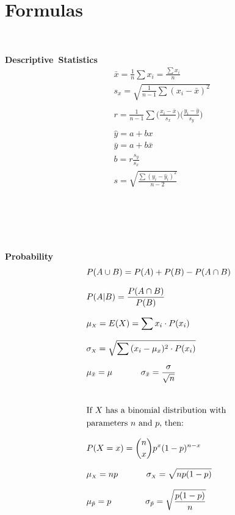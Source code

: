 
\section{Formulas}
\label{formulas}

\ \\[0mm]

\noindent%
\begin{minipage}[l]{0.32\textwidth}
\noindent%
\textbf{Descriptive~Statistics}
\begin{align*}
&\bar{x} =\frac{1}{n}\sum{x_i}=\frac{\sum{x_i}}{n} \\[3.5mm]
&s_x = \sqrt{\frac{1}{n-1}\sum{(x_i-\bar{x})^2}} \\ \\[3.5mm]
&r = \frac{1}{n-1}
    \sum{\Big(\frac{x_i-\bar{x}}{s_x}\Big)
    \Big(\frac{y_i-\bar{y}}{s_y}\Big)} \\ \\[3.5mm]
&\hat{y} = a+bx \\[3.5mm]
&\bar{y} = a + b\bar{x} \\[3.5mm]
&b = r\frac{s_y}{s_x} \\[3.5mm]
& s=\sqrt{\frac{\sum{(y_i-\hat{y}_i)^2}}{n-2}}
\end{align*}
\ \vspace{3mm}

\ 
\end{minipage}
\begin{minipage}[l]{0.13\textwidth}
\ 
\end{minipage}
\begin{minipage}[l]{0.35\textwidth}
\noindent%
\textbf{Probability}
\begin{align*}
&P(A \cup B) = P(A) + P(B) - P(A\cap B) \\[2.5mm]
&P(A | B) = \frac{P(A \cap B)}{P(B)} \\[2.5mm]
&\mu_{\scriptscriptstyle{X}}=E(X)=\sum{x_i\cdot  P(x_i)} \\[2.5mm]
&\sigma_{\scriptscriptstyle{X}}=\sqrt{\sum{(x_i-\mu_x)^2\cdot P(x_i)}} \\[2.5mm]
&\mu_{\bar{x}}
    = \mu \qquad \quad
        \ \sigma_{\bar{x}} = \frac{\sigma}{\sqrt{n}} \\[8mm]
&\text{If $X$ has a binomial distribution with} \\
&\text{parameters $n$ and $p$, then:} \\[2.5mm]
&P(X=x)={n\choose x} p^x(1-p)^{n-x} \\[2.5mm]
&\mu_{\scriptscriptstyle{X}}=np \qquad \quad  \ \sigma_{\scriptscriptstyle{X}}=\sqrt{np(1-p)} \\[2.5mm]
&\mu_{\hat{p}}
    = p\qquad \qquad
        \small{\sigma_{\hat{p}}=\sqrt{\frac{p(1-p)}{n}}}
\end{align*}
\end{minipage} \\[10mm]

